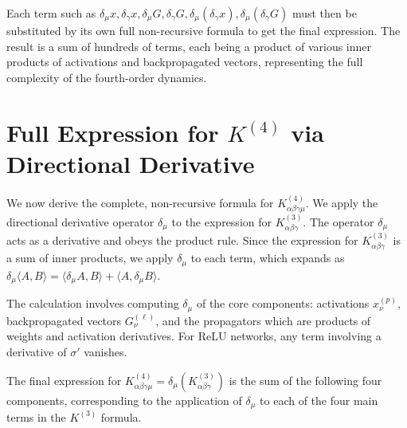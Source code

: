 \documentclass[11pt,a4paper]{article}
\theoremstyle{definition}
\begin{document}
Each term such as $\delta_\mu x, \delta_\gamma x, \delta_\mu G, \delta_\gamma G, \delta_\mu(\delta_\gamma x), \delta_\mu(\delta_\gamma G)$ must then be substituted by its own full non-recursive formula to get the final expression. The result is a sum of hundreds of terms, each being a product of various inner products of activations and backpropagated vectors, representing the full complexity of the fourth-order dynamics.






\newpage

\section{Full Expression for $K^{(4)}$ via Directional Derivative}

We now derive the complete, non-recursive formula for $K^{(4)}_{\alpha\beta\gamma\mu}$. We apply the directional derivative operator $\delta_\mu$ to the expression for $K^{(3)}_{\alpha\beta\gamma}$. The operator $\delta_\mu$ acts as a derivative and obeys the product rule. Since the expression for $K^{(3)}_{\alpha\beta\gamma}$ is a sum of inner products, we apply $\delta_\mu$ to each term, which expands as $\delta_\mu \langle A, B \rangle = \langle \delta_\mu A, B \rangle + \langle A, \delta_\mu B \rangle$.

The calculation involves computing $\delta_\mu$ of the core components: activations $x^{(p)}_\nu$, backpropagated vectors $G^{(\ell)}_\nu$, and the propagators which are products of weights and activation derivatives. For ReLU networks, any term involving a derivative of $\sigma'$ vanishes.

The final expression for $K^{(4)}_{\alpha\beta\gamma\mu} = \delta_\mu(K^{(3)}_{\alpha\beta\gamma})$ is the sum of the following four components, corresponding to the application of $\delta_\mu$ to each of the four main terms in the $K^{(3)}$ formula.
\end{document}
